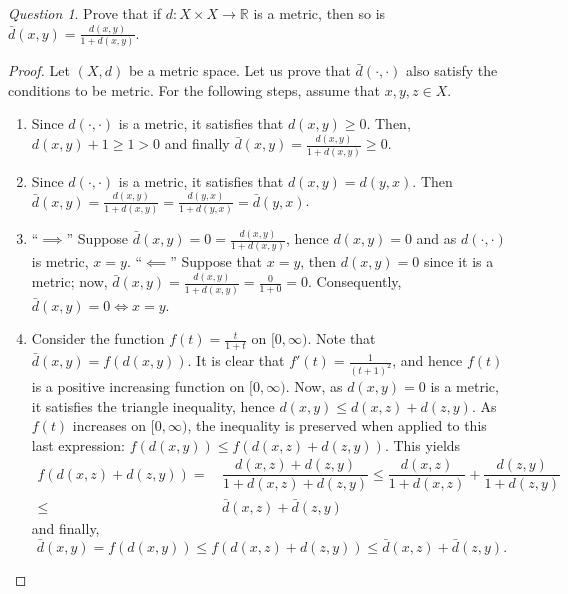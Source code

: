 \documentclass[11pt]{article}
\theoremstyle{definition}
\theoremstyle{remark}
\theoremstyle{remark}
\theoremstyle{remark}
\newtheorem*{question}{Question}
\begin{document}
\begin{question}
  Prove that if $d:X\times X\rightarrow\mathbb{R}$ is a metric, then so is
  $\bar{d}(x,y)=\frac{d(x,y)}{1+d(x,y)}$.
\end{question}
\begin{proof}
  Let $(X,d)$ be a metric space. Let us prove that $\bar{d}(\cdot,\cdot)$ also
  satisfy the conditions to be metric. For the following steps, assume that
  $x,y,z\in X$.
  \begin{enumerate}
    \item Since $d(\cdot,\cdot)$ is a metric, it satisfies that $d(x,y)\geq 0$.
      Then, $d(x,y)+1\geq 1 > 0$ and finally
      $\bar{d}(x,y)=\frac{d(x,y)}{1+d(x,y)}\geq 0$.
    \item Since $d(\cdot,\cdot)$ is a metric, it satisfies that $d(x,y)=d(y,x)$.
      Then
      $\bar{d}(x,y)=\frac{d(x,y)}{1+d(x,y)}=\frac{d(y,x)}{1+d(y,x)}=\bar{d}(y,x)$.
    \item ``$\implies$'' Suppose $\bar{d}(x,y)=0=\frac{d(x,y)}{1+d(x,y)}$, hence
      $d(x,y)=0$ and as $d(\cdot,\cdot)$ is metric, $x=y$. ``$\impliedby$''
      Suppose that $x=y$, then $d(x,y)=0$ since it is a metric; now,
      $\bar{d}(x,y)=\frac{d(x,y)}{1+d(x,y)}=\frac{0}{1+0}=0$. Consequently,
      $\bar{d}(x,y)=0 \iff x=y$.
    \item Consider the function $f(t)=\frac{t}{1+t}$ on $[0, \infty)$. Note that
      $\bar{d}(x,y)=f(d(x,y))$. It is clear that $f'(t)=\frac{1}{(t+1)^2}$, and
      hence $f(t)$ is a positive increasing function on $[0,\infty)$. Now, as
      $d(x,y)=0$ is a metric, it satisfies the triangle inequality, hence
      $d(x,y)\leq d(x,z)+d(z,y)$. As $f(t)$ increases on $[0,\infty)$, the
      inequality is preserved when applied to this last expression:
      $f(d(x,y))\leq f(d(x,z)+d(z,y))$. This yields
      \[
      \begin{split}
        f(d(x,z)+d(z,y))=&\,\dfrac{d(x,z)+d(z,y)}{1+d(x,z)+d(z,y)}\leq \dfrac{d(x,z)}{1+d(x,z)} + \dfrac{d(z,y)}{1+d(z,y)}\\
        \leq&\,\bar{d}(x,z)+\bar{d}(z,y)
      \end{split}
      \]
      and finally,
      \[
      \bar{d}(x,y)=f(d(x,y))\leq f(d(x,z)+d(z,y))\leq\bar{d}(x,z)+\bar{d}(z,y).
      \]
  \end{enumerate}
\end{proof}
\end{document}
